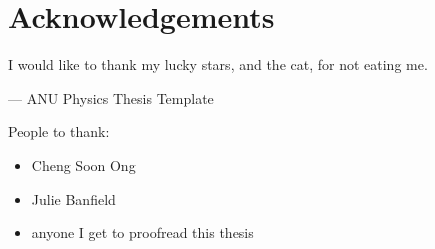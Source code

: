 
\chapter*{Acknowledgements}
\label{cha:ack}

    I would like to thank my lucky stars, and the cat, for not eating me.\\
    \begin{flushright}--- ANU Physics Thesis Template\end{flushright}

    People to thank:
    \begin{itemize}
        \item Cheng Soon Ong
        \item Julie Banfield
        \item anyone I get to proofread this thesis
    \end{itemize}



